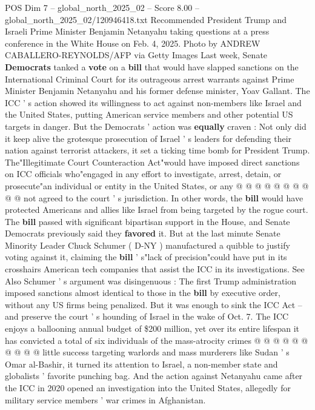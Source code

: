 \begin{textsample}{POS Dim 7 – global\_north\_2025\_02 – Score 8.00 – global\_north\_2025\_02/120946418.txt}  \label{ex:f7_pos_277}
Recommended President Trump and Israeli Prime Minister Benjamin Netanyahu taking questions at a press conference in the White House on Feb. 4, 2025.
Photo by ANDREW CABALLERO-REYNOLDS/AFP via Getty Images Last week, Senate \textbf{Democrats} tanked a \textbf{vote} on a \textbf{bill} that would have slapped sanctions on the International Criminal Court for its outrageous arrest warrants against Prime Minister Benjamin Netanyahu and his former defense minister, Yoav Gallant.
The ICC ' s action showed its willingness to act against non-members like Israel and the United States, putting American service members and other potential US targets in danger.
But the Democrats ' action was \textbf{equally} craven : Not only did it keep alive the grotesque prosecution of Israel ' s leaders for defending their nation against terrorist attackers, it set a ticking time bomb for President Trump.
The"Illegitimate Court Counteraction Act"would have imposed direct sanctions on ICC officials who"engaged in any effort to investigate, arrest, detain, or prosecute"an individual or entity in the United States, or any @ @ @ @ @ @ @ @ @ @ not agreed to the court ' s jurisdiction.
In other words, the \textbf{bill} would have protected Americans and allies like Israel from being targeted by the rogue court.
The \textbf{bill} passed with significant bipartisan support in the House, and Senate Democrats previously said they \textbf{favored} it.
But at the last minute Senate Minority Leader Chuck Schumer ( D-NY ) manufactured a quibble to justify voting against it, claiming the \textbf{bill} ' s"lack of precision"could have put in its crosshairs American tech companies that assist the ICC in its investigations.
See Also Schumer ' s argument was disingenuous : The first Trump administration imposed sanctions almost identical to those in the \textbf{bill} by executive order, without any US firms being penalized.
But it was enough to sink the ICC Act -- and preserve the court ' s hounding of Israel in the wake of Oct. 7.
The ICC enjoys a ballooning annual budget of \$200 million, yet over its entire lifespan it has convicted a total of six individuals of the mass-atrocity crimes @ @ @ @ @ @ @ @ @ @ little success targeting warlords and mass murderers like Sudan ' s Omar al-Bashir, it turned its attention to Israel, a non-member state and globalists ' favorite punching bag.
And the action against Netanyahu came after the ICC in 2020 opened an investigation into the United States, allegedly for military service members ' war crimes in Afghanistan.

\end{textsample}
